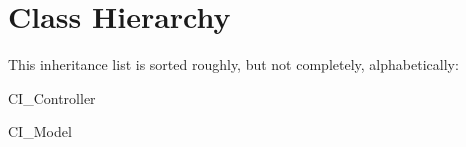 \section{Class Hierarchy}
This inheritance list is sorted roughly, but not completely, alphabetically\-:\begin{DoxyCompactList}
\item C\-I\-\_\-\-Controller\begin{DoxyCompactList}
\item {}
\item {}
\item {}
\end{DoxyCompactList}
\item C\-I\-\_\-\-Model\begin{DoxyCompactList}
\item {}
\item {}
\end{DoxyCompactList}
\end{DoxyCompactList}

